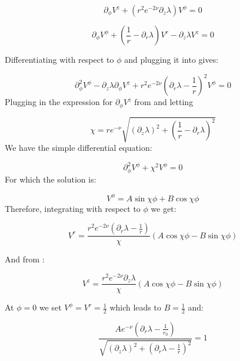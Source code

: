 \documentclass{article}
\begin{document}
\begin{equation}
\label{eq:V_z-V_phi}
\partial_{\phi}V^{z}+\left(r^{2}e^{-2\nu}\partial_{z}\lambda\right)V^{\phi}=0
\end{equation}

\begin{equation}
\partial_{\phi}V^{\phi}+\left(\frac{1}{r}-\partial_{r}\lambda\right)V^{r}-\partial_{z}\lambda V^{z}=0\label{eq:V-phi-r-z}
\end{equation}

Differentiating  with respect to $\phi$ and plugging it into  gives:

\begin{equation}
\partial^{2}_{\phi}V^{\phi}-\partial_z\lambda\partial_{\phi}V^z+r^{2}e^{-2\nu}\left(\partial_r\lambda-\frac{1}{r}\right)^2V^{\phi}=0
\end{equation}
Plugging in the expression for $\partial_{\phi}V^z$ from
 and letting 

\begin{equation}
\label{eq:def-chi}
\chi=re^{-\nu}\sqrt{\left(\partial_z\lambda\right)^2+\left(\frac{1}{r}-\partial_r\lambda\right)^2}
\end{equation}
We have the simple differential equation:

\begin{equation}
\partial^2_\phi V^\phi+\chi^2 V^\phi=0
\end{equation}
For which the solution is:

\begin{equation}
V^{\phi}=A\sin\chi\phi+B\cos\chi\phi
\end{equation}
Therefore, integrating  with respect to $\phi$ we get:

\begin{equation}
V^{r}=\frac{r^2e^{-2\nu}(\partial_r\lambda-\frac{1}{r})}{\chi}\left(A\cos\chi\phi-B\sin\chi\phi\right)
\end{equation}

And from :

\begin{equation}
V^{z}=\frac{r^2 e^{-2\nu}\partial_z\lambda}{\chi}\left(A\cos\chi\phi-B\sin\chi\phi\right)
\end{equation}

At $\phi=0$ we set $V^\phi=V^r=\frac{1}{2}$ which leads to $B=\frac{1}{2}$ and:

\begin{equation}
  \label{eq:conditions}
  \frac{A e^{-\nu}(\partial_r\lambda-\frac{1}{r_0})}{\sqrt{\left(\partial_z\lambda\right)^2+\left(\partial_r\lambda-\frac{1}{r}\right)^2}}=1
\end{equation}
\end{document}
